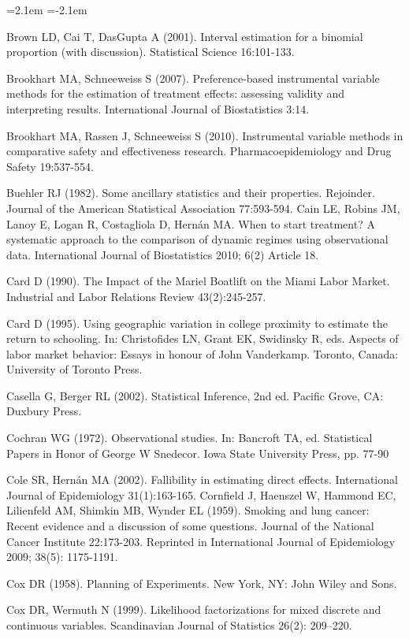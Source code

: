 \begin{list}{}{\leftmargin=2.1em   \itemindent=-2.1em \parsep=0pt \itemsep=1.6pt \topsep=4pt \rightmargin=0pt}
\item Brown LD, Cai T, DasGupta A (2001). Interval estimation for a binomial proportion (with discussion). Statistical Science 16:101-133.
\item Brookhart MA, Schneeweiss S (2007). Preference-based instrumental variable methods for the estimation of treatment effects: assessing validity and interpreting results. International Journal of Biostatistics 3:14.
\item Brookhart MA, Rassen J, Schneeweiss S (2010). Instrumental variable methods in comparative safety and effectiveness research. Pharmacoepidemiology and Drug Safety 19:537-554.
\item Buehler RJ (1982). Some ancillary statistics and their properties. Rejoinder. Journal of the American Statistical Association 77:593-594. Cain LE, Robins JM, Lanoy E, Logan R, Costagliola D, Hernán MA. When to start treatment? A systematic approach to the comparison of dynamic regimes using observational data. International Journal of Biostatistics 2010; 6(2) Article 18.
\item Card D (1990). The Impact of the Mariel Boatlift on the Miami Labor Market. Industrial and Labor Relations Review 43(2):245-257.
\item Card D (1995). Using geographic variation in college proximity to estimate the return to schooling. In: Christofides LN, Grant EK, Swidinsky R, eds. Aspects of labor market behavior: Essays in honour of John Vanderkamp. Toronto, Canada: University of Toronto Press.
\item Casella G, Berger RL (2002). Statistical Inference, 2nd ed. Pacific Grove, CA: Duxbury Press.
\item Cochran WG (1972). Observational studies. In: Bancroft TA, ed. Statistical Papers in Honor of George W Snedecor. Iowa State University Press, pp. 77-90
\item Cole SR, Hernán MA (2002). Fallibility in estimating direct effects. International Journal of Epidemiology 31(1):163-165. Cornfield J, Haenszel W, Hammond EC, Lilienfeld AM, Shimkin MB, Wynder EL (1959). Smoking and lung cancer: Recent evidence and a discussion of some questions. Journal of the National Cancer Institute 22:173-203. Reprinted in International Journal of Epidemiology 2009; 38(5): 1175-1191.
\item Cox DR (1958). Planning of Experiments. New York, NY: John Wiley and Sons.
\item Cox DR, Wermuth N (1999). Likelihood factorizations for mixed discrete and continuous variables. Scandinavian Journal of Statistics 26(2): 209–220.

\end{list}
